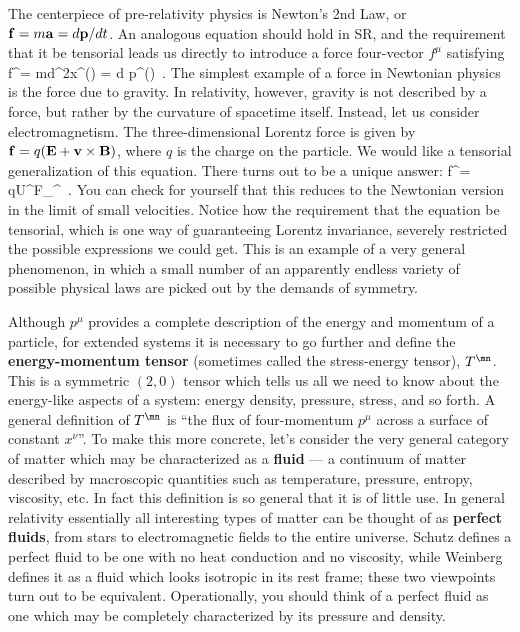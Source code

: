 The centerpiece of pre-relativity physics is Newton's 2nd Law,
or ${\bf f}=m{\bf a} = d{\bf p}/dt$.  An analogous equation should hold
in SR, and the requirement that it be tensorial leads us directly
to introduce a force four-vector $f^\mu$ satisfying
\be
  f^\mu = m{{d^2}}x^\mu(\tau) = {{d}}
  p^\mu(\tau)\ .\label{1.102}
\ee
The simplest example of a force in Newtonian physics is the force
due to gravity.  In relativity, however, gravity is not described
by a force, but rather by the curvature of spacetime itself.  Instead,
let us consider electromagnetism.  The three-dimensional Lorentz
force is given by ${\bf f} = q({\bf E} + {\bf v}\times{\bf B})$,
where $q$ is the charge on the particle.  We would like a tensorial
generalization of this equation.  There turns out to be a unique answer:
\be
  f^\mu = qU^\lambda F_\lambda{}^\mu\ .\label{1.103}
\ee
You can check for yourself that this reduces to the Newtonian version 
in the limit of small velocities.  Notice how the requirement that
the equation be tensorial, which is one way of guaranteeing Lorentz
invariance, severely restricted the possible expressions we could
get.  This is an example of a very general phenomenon, in which 
a small number of an apparently endless variety of possible physical laws 
are picked out by the demands of symmetry.

Although $p^\mu$ provides a complete description of the energy and
momentum of a particle, for extended systems it is necessary to go
further and define the {\bf energy-momentum tensor} (sometimes called
the stress-energy tensor), $T^\mn$.  This is a symmetric $(2,0)$ tensor 
which tells us all we need to know about the energy-like aspects of a 
system: energy density, pressure, stress, and so
forth.  A general definition of $T^\mn$ is ``the flux of four-momentum
$p^\mu$ across a surface of constant $x^\nu$''.  To make this more
concrete, let's consider the very general category of matter which
may be characterized as a {\bf fluid} --- a continuum of matter
described by macroscopic quantities  such as temperature, pressure,
entropy, viscosity, etc.  In fact this definition is so general that
it is of little use.  In general relativity essentially all interesting
types of matter can be thought of as {\bf perfect fluids}, from
stars to electromagnetic fields to the entire universe.  Schutz
defines a perfect fluid to be one with no heat conduction and no
viscosity, while Weinberg defines it as a fluid which looks isotropic
in its rest frame; these two viewpoints turn out to be equivalent.
Operationally, you should think of a perfect fluid as one which may
be completely characterized by its pressure and density.

